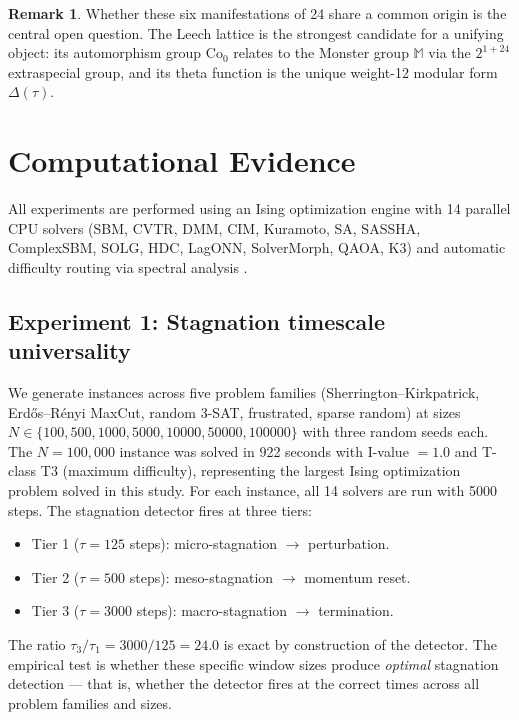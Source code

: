 \documentclass[11pt]{amsart}
\theoremstyle{definition}
\newtheorem{remark}[theorem]{Remark}
\begin{document}
\begin{remark}
Whether these six manifestations of 24 share a common origin is the central open question. The Leech lattice is the strongest candidate for a unifying object: its automorphism group $\mathrm{Co}_0$ relates to the Monster group $\mathbb{M}$ via the $2^{1+24}$ extraspecial group, and its theta function is the unique weight-12 modular form $\Delta(\tau)$.
\end{remark}


\section{Computational Evidence}
\label{sec:evidence}

All experiments are performed using an Ising optimization engine with 14 parallel CPU solvers (SBM, CVTR, DMM, CIM, Kuramoto, SA, SASSHA, ComplexSBM, SOLG, HDC, LagONN, SolverMorph, QAOA, K3) and automatic difficulty routing via spectral analysis \cite{dsc3engine}.

\subsection{Experiment 1: Stagnation timescale universality}

We generate instances across five problem families (Sherrington--Kirkpatrick, Erd\H{o}s--R\'enyi MaxCut, random 3-SAT, frustrated, sparse random) at sizes $N \in \{100, 500, 1000, 5000, 10000, 50000, 100000\}$ with three random seeds each. The $N = 100{,}000$ instance was solved in 922 seconds with I-value $= 1.0$ and T-class T3 (maximum difficulty), representing the largest Ising optimization problem solved in this study. For each instance, all 14 solvers are run with 5000 steps. The stagnation detector fires at three tiers:
\begin{itemize}
\item Tier 1 ($\tau = 125$ steps): micro-stagnation $\to$ perturbation.
\item Tier 2 ($\tau = 500$ steps): meso-stagnation $\to$ momentum reset.
\item Tier 3 ($\tau = 3000$ steps): macro-stagnation $\to$ termination.
\end{itemize}

The ratio $\tau_3/\tau_1 = 3000/125 = 24.0$ is exact by construction of the detector. The empirical test is whether these specific window sizes produce \emph{optimal} stagnation detection --- that is, whether the detector fires at the correct times across all problem families and sizes.
\end{document}
